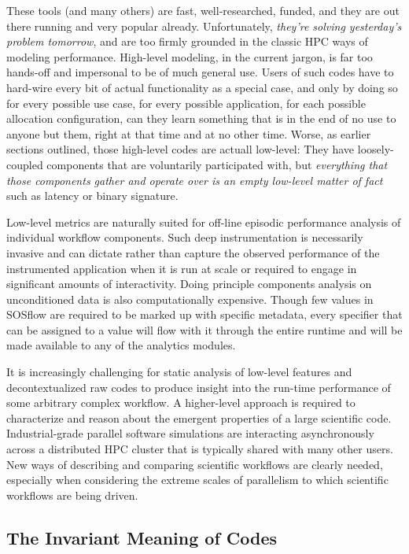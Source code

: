 These tools (and many others) are fast, well-researched, funded, and
they are out there running and very popular already. Unfortunately,
\textit{they're solving yesterday's problem tomorrow}, and are too
firmly grounded in the classic HPC ways of modeling
performance. High-level modeling, in the current jargon, is far too
hands-off and impersonal to be of much general use. Users of such
codes have to hard-wire every bit of actual functionality as a special
case, and only by doing so for every possible use case, for every
possible application, for each possible allocation configuration, can
they learn something that is in the end of no use to anyone but them,
right at that time and at no other time. Worse, as earlier sections
outlined, those high-level codes are actuall low-level: They have
loosely-coupled components that are voluntarily participated with,
but \textit{everything that those components gather and operate over
is an empty low-level matter of fact} such as latency or binary signature.

Low-level metrics are naturally suited for off-line episodic
performance analysis of individual workflow components. Such deep
instrumentation is necessarily invasive and can dictate rather than
capture the observed performance of the instrumented application 
when it is run at scale or required to engage in significant amounts of
interactivity. Doing principle components analysis on unconditioned
data is also computationally expensive.  Though few values in SOSflow
are required to be marked up with specific metadata, every specifier
that can be assigned to a value will flow with it through the entire
runtime and will be made available to any of the analytics modules.

It is increasingly challenging for static analysis of low-level
features and decontextualized raw codes to produce insight into the
run-time performance of some arbitrary complex workflow.  A
higher-level approach is required to characterize and reason about the
emergent properties of a large scientific code. Industrial-grade
parallel software simulations are interacting asynchronously across a
distributed HPC cluster that is typically shared with many other
users. New ways of describing and comparing scientific workflows are
clearly needed, especially when considering the extreme scales of
parallelism to which scientific workflows are being driven.



\subsection{The Invariant Meaning of Codes}

